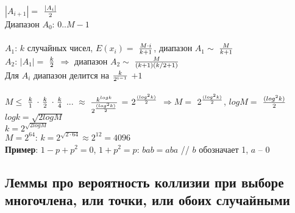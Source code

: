 $|A_{i+1}| =$ $|A_i|\over{2}$ \\
Диапазон $A_0$: $0.. M-1$ \\\\
$A_1$: $k$ случайных чисел, $E(x_i)=$ $M \cdot i\over{k+1}$, диапазон $A_1 \sim$  $M\over{k+1}$  \\ 
$A_2$: $|A_1| =$ $k\over{2}$ $\Rightarrow$ диапазон $A_2 \sim$ $M\over{(k+1)(k/2 + 1)}$ \\
Для $A_i$ диапазон делится на $k\over{2^{i-1}}$ $+ 1$ \\\\
$M \le$ $k\over{1}$ $\cdot$ $k\over{2}$ $\cdot$ $k\over{4}$ ... $\approx$ ${k^{log k}}\over{2^{({log^2 k})\over{2}}} $ = $2^{({log^2 k})\over{2}}$ $\Rightarrow M =$ $2^{({log^2 k})\over{2}}$, $log M =$ $ ({log^2 k})\over{2}$\\
$log k = \sqrt{2logM}$\\
$k = 2^{\sqrt{2logM}}$\\
$M = 2^{64}$: $k = 2^{\sqrt{2 \cdot 64}} \approx 2^{12} = 4096$ \\
\textbf{Пример}: $1 - p + p^2 = 0$, $1 + p^2 = p$: $bab = aba$ // $b$ обозначает 1, $a$ -- 0 \\

\subsection{Леммы
про вероятность коллизии при выборе многочлена, или точки, или обоих случайными} 	

